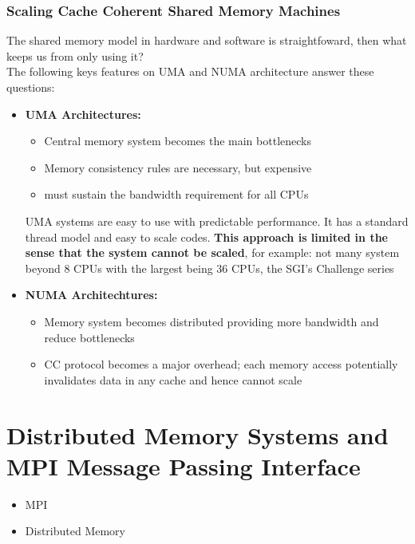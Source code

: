 \documentclass[12pt, a4paper]{report}
\begin{document}
\subsection{Scaling Cache Coherent Shared Memory Machines}
The shared memory model in hardware and software is straightfoward, then what keeps us from only using it?\\
The following keys features on UMA and NUMA architecture answer these questions:
\begin{itemize}
    \item {\bfseries{UMA Architectures:}}
    \begin{itemize}
        \item Central memory system becomes the main bottlenecks
        \item Memory consistency rules are necessary, but expensive
        \item must sustain the bandwidth requirement for all CPUs
    \end{itemize}
    UMA systems are easy to use with predictable performance. It has a standard thread model and easy to scale codes. {\bfseries{This approach is limited in the
    sense that the system cannot be scaled}}, for example: not many system beyond 8 CPUs  with the largest being 36 CPUs, the SGI's Challenge series
    \item {\bfseries{NUMA Architechtures:}}
    \begin{itemize}
        \item Memory system becomes distributed providing more bandwidth and reduce bottlenecks
        \item CC protocol becomes a major overhead; each memory access potentially invalidates data in any cache and hence cannot scale
    \end{itemize}
\end{itemize}




\chapter{ Distributed Memory Systems and MPI \textendash Message Passing Interface}
\begin{tcolorbox}[width=\textwidth,colback={white},title={In this chapter\dots},colbacktitle={lightslategray},coltitle=white]    
    \begin{itemize}
        \item MPI
        \item Distributed Memory
    \end{itemize}
 \end{tcolorbox}
\end{document}
